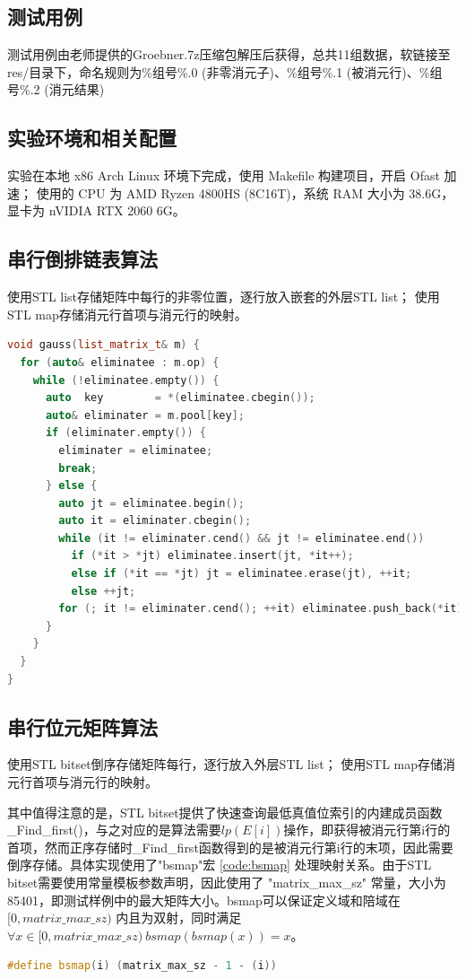\documentclass[a4paper]{article}
\begin{document}
\subsection{测试用例}
测试用例由老师提供的Groebner.7z压缩包解压后获得，总共11组数据，软链接至res/目录下，命名规则为\%组号\%.0 (非零消元子)、\%组号\%.1 (被消元行)、\%组号\%.2 (消元结果)

\subsection{实验环境和相关配置}
实验在本地 x86 Arch Linux 环境下完成，使用 Makefile 构建项目，开启 Ofast 加速；
使用的 CPU 为 AMD Ryzen 4800HS (8C16T)，系统 RAM 大小为 38.6G，显卡为 nVIDIA RTX 2060 6G。

\subsection{串行倒排链表算法}
使用STL list存储矩阵中每行的非零位置，逐行放入嵌套的外层STL list；
使用STL map存储消元行首项与消元行的映射。

\begin{lstlisting}[frame=trbl, language={C++}, caption={串行倒排链表消元部分}]
void gauss(list_matrix_t& m) {
  for (auto& eliminatee : m.op) {
    while (!eliminatee.empty()) {
      auto  key        = *(eliminatee.cbegin());
      auto& eliminater = m.pool[key];
      if (eliminater.empty()) {
        eliminater = eliminatee;
        break;
      } else {
        auto jt = eliminatee.begin();
        auto it = eliminater.cbegin();
        while (it != eliminater.cend() && jt != eliminatee.end())
          if (*it > *jt) eliminatee.insert(jt, *it++);
          else if (*it == *jt) jt = eliminatee.erase(jt), ++it;
          else ++jt;
        for (; it != eliminater.cend(); ++it) eliminatee.push_back(*it);
      }
    }
  }
}
\end{lstlisting}

\subsection{串行位元矩阵算法}
使用STL bitset倒序存储矩阵每行，逐行放入外层STL list；
使用STL map存储消元行首项与消元行的映射。

其中值得注意的是，STL bitset提供了快速查询最低真值位索引的内建成员函数\_Find\_first()，与之对应的是算法需要$lp(E[i])$操作，即获得被消元行第i行的首项，然而正序存储时\_Find\_first函数得到的是被消元行第i行的末项，因此需要倒序存储。具体实现使用了"bsmap"宏 \ref{code:bsmap} 处理映射关系。由于STL bitset需要使用常量模板参数声明，因此使用了 "matrix\_max\_sz" 常量，大小为 85401，即测试样例中的最大矩阵大小。bsmap可以保证定义域和陪域在 $[0, matrix\_max\_sz)$ 内且为双射，同时满足 $\forall{x \in [0, matrix\_max\_sz)}\ bsmap(bsmap(x)) = x$。
\begin{lstlisting}[frame=trbl, language={C++}, caption={bsmap 宏}, label = {code:bsmap}]
#define bsmap(i) (matrix_max_sz - 1 - (i))
\end{lstlisting}
\end{document}
